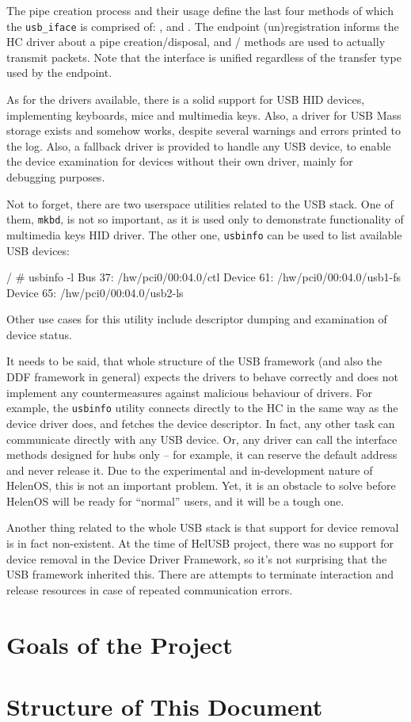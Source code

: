 The pipe creation process and their usage define the last four methods of which
the \texttt{usb\_iface} is comprised of: , 
and . The endpoint (un)registration informs the HC driver about
a pipe creation/disposal, and / methods are used to
actually transmit packets. Note that the interface is unified regardless of the
transfer type used by the endpoint.

As for the drivers available, there is a solid support for USB HID devices,
implementing keyboards, mice and multimedia keys. Also, a driver for USB Mass
storage exists and somehow works, despite several warnings and errors printed
to the log. Also, a fallback driver is provided to handle any USB device, to
enable the device examination for devices without their own driver, mainly for
debugging purposes.

Not to forget, there are two userspace utilities related to the USB stack. One
of them, \texttt{mkbd}, is not so important, as it is used only to demonstrate
functionality of multimedia keys HID driver. The other one, \texttt{usbinfo}
can be used to list available USB devices:

\begin{bdsh}
/ # usbinfo -l
Bus 37: /hw/pci0/00:04.0/ctl
	Device 61: /hw/pci0/00:04.0/usb1-fs
	Device 65: /hw/pci0/00:04.0/usb2-ls
\end{bdsh}

Other use cases for this utility include descriptor dumping and examination of
device status.

It needs to be said, that whole structure of the USB framework (and also the
DDF framework in general) expects the drivers to behave correctly and does not
implement any countermeasures against malicious behaviour of drivers. For
example, the \texttt{usbinfo} utility connects directly to the HC in the same
way as the device driver does, and fetches the device descriptor. In fact, any
other task can communicate directly with any USB device. Or, any driver can
call the interface methods designed for hubs only -- for example, it can
reserve the default address and never release it. Due to the experimental and
in-development nature of HelenOS, this is not an important problem. Yet, it is
an obstacle to solve before HelenOS will be ready for ``normal'' users, and it
will be a tough one.

Another thing related to the whole USB stack is that support for device
removal is in fact non-existent. At the time of HelUSB project, there was no
support for device removal in the Device Driver Framework, so it's not
surprising that the USB framework inherited this. There are attempts to
terminate interaction and release resources in case of repeated communication
errors.

\section{Goals of the Project}


\section{Structure of This Document}
